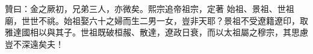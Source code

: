 \begin{pinyinscope}
 贊曰：金之厥初，兄弟三人，亦微矣。熙宗追帝祖宗，定著
 始祖、景祖、世祖廟，世世不祧。始祖娶六十之婦而生二男一女，豈非天耶？景祖不受遼籍遼印，取雅達國相以與其子。世祖既破桓赧、散達，遼政日衰，而以太祖屬之穆宗，其思慮豈不深遠矣夫！



\end{pinyinscope}
